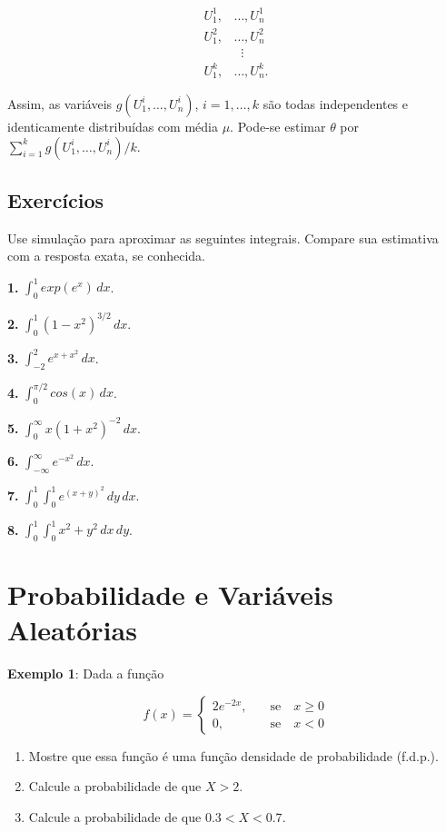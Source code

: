 \documentclass[
]{book}
\providecommand{\tightlist}{%
  \setlength{\itemsep}{0pt}\setlength{\parskip}{0pt}}
\begin{document}
\begin{align*}
U_{1}^{1},&\ldots,U_{n}^{1} \\
U_{1}^{2},&\ldots,U_{n}^{2} \\
& \;\;\vdots \\
U_{1}^{k},&\ldots,U_{n}^{k}.
\end{align*}

Assim, as variáveis \(g(U_{1}^{i},\ldots, U_{n}^{i})\), \(i=1,\ldots,k\) são
todas independentes e identicamente distribuídas com média \(\mu\).
Pode-se estimar \(\theta\) por
\(\sum_{i=1}^{k}g(U_{1}^{i},\ldots, U_{n}^{i})/k\).

\section{Exercícios}\label{exercuxedcios-21}

Use simulação para aproximar as seguintes integrais. Compare sua
estimativa com a resposta exata, se conhecida.

\textbf{1.} \(\int_{0}^{1}exp(e^x)\, dx\).

\textbf{2.} \(\int_{0}^{1}(1-x^2)^{3/2}\, dx\).

\textbf{3.} \(\int_{-2}^{2}e^{x+x^2}\, dx\).

\textbf{4.} \(\int_{0}^{\pi/2} cos(x)\, dx\).

\textbf{5.} \(\int_{0}^{\infty}x(1+x^2)^{-2}\, dx\).

\textbf{6.} \(\int_{-\infty}^{\infty}e^{-x^2}\, dx\).

\textbf{7.} \(\int_{0}^{1}\int_{0}^{1}e^{(x+y)^2}\,dy\,dx\).

\textbf{8.} \(\int_0^1 \int_0^1 x^2 + y^2 \, dx \, dy\).

\chapter{Probabilidade e Variáveis Aleatórias}\label{probabilidade-e-variuxe1veis-aleatuxf3rias}

\textbf{Exemplo 1}: Dada a função

\[f(x) = \begin{cases}
2e^{-2x},& \quad \text{se} \quad x\geq 0 \\
0,& \quad \text{se} \quad x<0
\end{cases}\]

\begin{enumerate}
\def\labelenumi{\alph{enumi})}
\tightlist
\item
  Mostre que essa função é uma função densidade de probabilidade (f.d.p.).
\item
  Calcule a probabilidade de que \(X>2\).
\item
  Calcule a probabilidade de que \(0.3 < X < 0.7\).
\end{enumerate}
\end{document}
